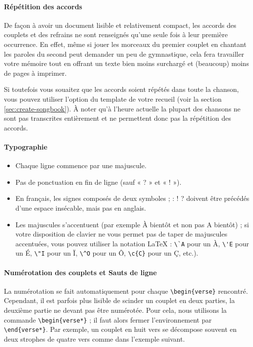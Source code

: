 \paragraph{Répétition des accords}
De façon à avoir un document lisible et relativement compact, les
accords des couplets et des refrains ne sont renseignés qu'une seule
fois à leur première occurrence. En effet, même si jouer les morceaux
du premier couplet en chantant les paroles du second peut demander un
peu de gymnastique, cela fera travailler votre mémoire tout en offrant
un texte bien moins surchargé et (beaucoup) moins de pages à imprimer.

Si toutefois vous souaitez que les accords soient répétés dans toute la
chanson, vous pouvez utiliser l'option  du
template de votre recueil (voir la section \ref{sec:create-songbook}).
À noter qu'à l'heure actuelle la plupart des chansons ne sont pas
transcrites entièrement et ne permettent donc pas la répétition des
accords.

\paragraph{Typographie}
\begin{itemize}
  \item Chaque ligne commence par une majuscule.
  \item Pas de ponctuation en fin de ligne (sauf « ? » et « ! »).
  \item En français, les signes composés de deux symboles
    {\og}; : ! ?{\fg} doivent être précédés d'une espace insécable, mais
    pas en anglais.
  \item Les majuscules s'accentuent (par exemple {\og}À bientôt{\fg}
    et non pas {\og}A bientôt{\fg}) ; si votre disposition de clavier ne
    vous permet pas de taper de majuscules accentuées, vous pouvez
    utiliser la notation \LaTeX{} : \verb|\`A| pour un \`A, \verb|\'E|
    pour un \'E, \verb|\"I| pour un \"I, \verb|\^O| pour un \^O,
    \verb|\c{C}| pour un \c{C}, etc.).
\end{itemize}

\paragraph{Numérotation des couplets et Sauts de ligne}
La numérotation se fait automatiquement pour chaque
\verb|\begin{verse}| rencontré. Cependant, il est parfois plus
lisible de scinder un couplet en deux parties, la deuxième partie ne
devant pas être numérotée. Pour cela, nous utilisons la commande
\verb|\begin{verse*}| ; il faut alors fermer l'environnement par
\verb|\end{verse*}|. Par exemple, un couplet en huit vers se
décompose souvent en deux strophes de quatre vers comme dans l'exemple
suivant.

